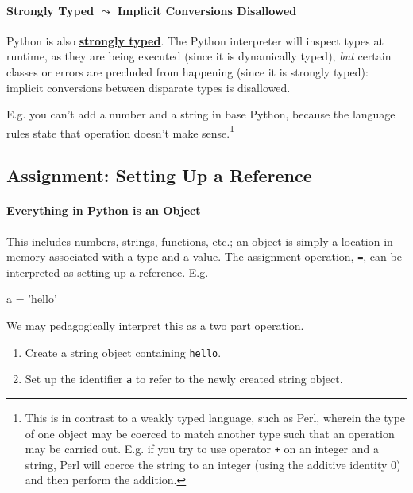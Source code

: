 \documentclass[12pt,letterpaper,twoside]{article}
\begin{document}
\vspace{-3ex}
\paragraph{Strongly Typed $\leadsto$ Implicit Conversions Disallowed} Python is also
\href{https://en.wikipedia.org/wiki/Strong_and_weak_typing#Definitions_of_%22strong%22_or_%22weak%22}{\textbf{strongly typed}}.
The Python interpreter will inspect types at runtime, as they are being
executed (since it is dynamically typed), \emph{but} certain classes or errors are precluded from happening (since it is strongly typed):
implicit conversions between disparate types is disallowed.
  
E.g. you can't add a number and a string in base Python, because the language rules state that operation doesn't make sense.\footnote{This is in contrast to a weakly typed language, such as Perl, wherein the type of one object may be coerced to match another type such that an operation may be carried out. E.g. if you try to use operator \texttt{+} on an integer and a string, Perl will coerce the string to an integer (using the additive identity 0) and then perform the addition.}

\subsection{Assignment: Setting Up a Reference}
\vspace{-1ex}
\paragraph{Everything in Python is an Object} This includes
numbers, strings, functions, etc.;
an object is simply a location in memory associated with a type and a value.
The assignment operation, \texttt{=}, can be interpreted as setting up a
reference. E.g.

\begin{python}
a = 'hello'
\end{python}

We may pedagogically interpret this as a two part operation.
\vspace{-2ex}
\begin{enumerate}
\item
  Create a string object containing
  \texttt{\textquotesingle{}hello\textquotesingle{}}.
\item
  Set up the identifier \texttt{a} to refer to the newly created string
  object.
\end{enumerate}
\end{document}
